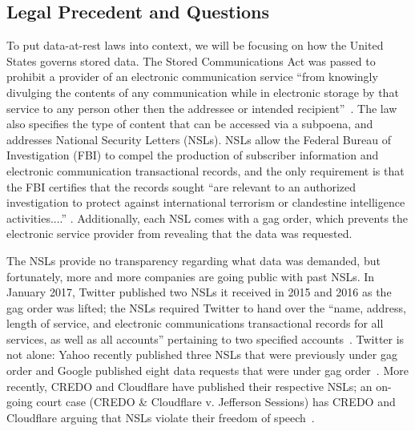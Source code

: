 \subsection{Legal Precedent and Questions}

To put data-at-rest laws into context, we will be focusing on how the United
States governs stored data.  The Stored Communications Act was passed to
prohibit a provider of an electronic communication service ``from knowingly
divulging the contents of any communication while in electronic storage by
that service to any person other then the addressee or intended
recipient''~\cite{stored_comm}.  The law also specifies the type of content
that can be accessed via a subpoena, and addresses National Security Letters
(NSLs).  NSLs allow the Federal Bureau of Investigation (FBI) to compel the
production of subscriber information and electronic communication
transactional records, and the only requirement is that the FBI certifies that
the records sought ``are relevant to an authorized investigation to protect
against international terrorism or clandestine intelligence activities....''
\cite{stored_comm}.  Additionally, each NSL comes with a gag order, which
prevents the electronic service provider from revealing that the data was
requested.

The NSLs provide no transparency regarding what data was demanded, but
fortunately, more and more companies are going public with past NSLs.  In
January 2017, Twitter published two NSLs it received in 2015 and 2016 as the
gag order was lifted; the NSLs required Twitter to hand over the ``name,
address, length of service, and electronic communications transactional
records for all services, as well as all accounts'' pertaining to two
specified accounts~\cite{twitter_gag}.  Twitter is not alone: Yahoo recently
published three NSLs that were previously under gag order and Google published
eight data requests that were under gag order~\cite{yahoo_gag,google_gag}.
More recently, CREDO and Cloudflare have published their respective NSLs; an
on-going court case (CREDO \& Cloudflare v. Jefferson Sessions) has CREDO and
Cloudflare arguing that NSLs violate their freedom of
speech~\cite{cloudflare_gag}.

